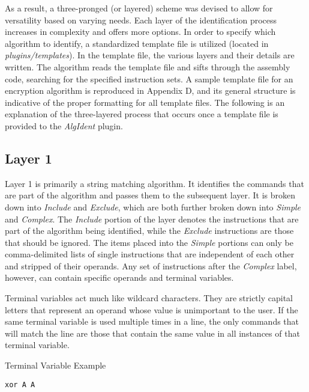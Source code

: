 \documentclass{article}
\begin{document}
As a result, a three-pronged (or layered) scheme was devised to allow for versatility based on varying needs.  Each layer of the identification process increases in complexity and offers 
more options.  In order to specify which algorithm to identify, a standardized template file is utilized (located in \emph{plugins/templates}).  In the template file, the various
layers and their details are written.  The algorithm reads the template file and sifts through the assembly code, searching for the specified instruction sets.
A sample template file for an encryption algorithm is reproduced in Appendix D, and its general structure is indicative of the proper formatting for all template files. The following is an explanation of the three-layered process
that occurs once a template file is provided to the \emph{AlgIdent} plugin. \\

\subsection*{Layer 1}
Layer 1 is primarily a string matching algorithm.  It identifies the commands that are part of the algorithm and passes them to the subsequent layer.  It is broken down into \emph{Include} 
and \emph{Exclude}, which are both further broken down into \emph{Simple} and \emph{Complex}. The \emph{Include} portion of the layer denotes
the instructions that are part of the algorithm being identified, while the \emph{Exclude} instructions are those that should be ignored.  The items placed into the \emph{Simple} portions can only be comma-delimited lists of single 
instructions that are independent of each other and stripped of their operands.  Any set of instructions after the \emph{Complex} label, however, can contain specific operands and terminal variables.

Terminal variables act much like wildcard characters. They are strictly capital letters that represent an operand whose value is unimportant to the user.  If the same terminal variable is used multiple times in a line, the only  
commands that will match the line are those that contain the same value in all instances of that terminal variable. \\  
\begin{algorithm}
\lstset{language=[mips]Assembler}
\caption{Terminal Variable Example}
\begin{lstlisting}
xor A A
\end{lstlisting}
\end{algorithm}
\end{document}

